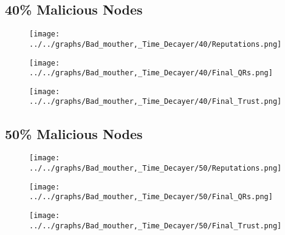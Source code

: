 \begin{minipage}[t]{0.49\columnwidth}
\subsection*{40\% Malicious Nodes}
    \begin{figure}[H]
        \centering
        \texttt{[image: ../../graphs/Bad\_mouther,\_Time\_Decayer/40/Reputations.png]}
    \end{figure}
    \begin{figure}[H]
        \centering
        \texttt{[image: ../../graphs/Bad\_mouther,\_Time\_Decayer/40/Final\_QRs.png]}
    \end{figure}
\end{minipage}
\begin{minipage}[t]{0.49\columnwidth}
    \begin{figure}[H]
        \centering
        \texttt{[image: ../../graphs/Bad\_mouther,\_Time\_Decayer/40/Final\_Trust.png]}
    \end{figure}
\end{minipage}

\begin{minipage}[t]{0.49\columnwidth}
\subsection*{50\% Malicious Nodes}
    \begin{figure}[H]
        \centering
        \texttt{[image: ../../graphs/Bad\_mouther,\_Time\_Decayer/50/Reputations.png]}
    \end{figure}
    \begin{figure}[H]
        \centering
        \texttt{[image: ../../graphs/Bad\_mouther,\_Time\_Decayer/50/Final\_QRs.png]}
    \end{figure}
\end{minipage}
\begin{minipage}[t]{0.49\columnwidth}
    \begin{figure}[H]
        \centering
        \texttt{[image: ../../graphs/Bad\_mouther,\_Time\_Decayer/50/Final\_Trust.png]}
    \end{figure}
\end{minipage}


